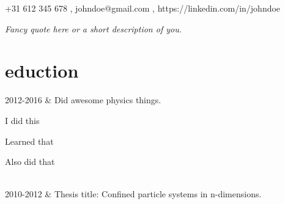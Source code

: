 \documentclass[]{cv-roald}
\begin{document}
\pagestyle{empty} %

{\faMobile \hspace{\FAspace} +31 612 345 678 \sep \faEnvelope \hspace{\FAspace} johndoe@gmail.com \sep \faLinkedinSquare \hspace{\FAspace} https://linkedin.com/in/johndoe
}

\textit{Fancy quote here or a short description of you.}

\section*{eduction}
\begin{tabularcv}
    2012-2016   &   
                    \newline Did awesome physics things.
                    \begin{tabitemize}
                        \item I did this
                        \item Learned that
                        \item Also did that
                    \end{tabitemize}
                    \\[\vspacepar] %
    2010-2012   &   
                    \newline Thesis title: Confined particle systems in n-dimensions.
\end{tabularcv}
\end{document}
